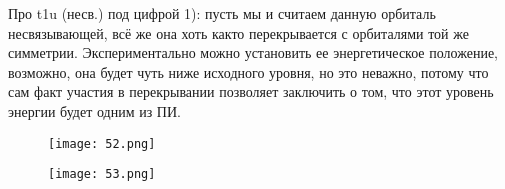 \par\smallskip

Про t1u (несв.) под цифрой 1): пусть мы и считаем
данную орбиталь несвязывающей, всё же она хоть както перекрывается с орбиталями той же симметрии.
Экспериментально можно установить ее энергетическое
положение, возможно, она будет чуть ниже исходного
уровня, но это неважно, потому что сам факт участия в
перекрывании позволяет заключить о том, что этот
уровень энергии будет одним из ПИ.

\begin{figure}[H]
	\centering
	{\texttt{[image: 52.png]}}
\end{figure}

\begin{figure}[H]
	\centering
	{\texttt{[image: 53.png]}}
\end{figure}